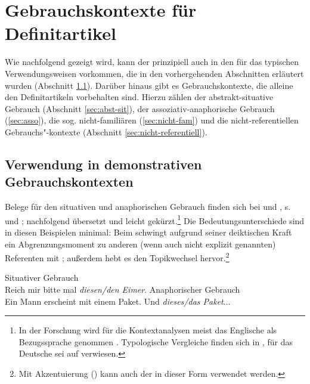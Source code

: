 \section{Gebrauchskontexte für Definitartikel}\label{sec:definitartikel}

Wie nachfolgend gezeigt wird, kann der  prinzipiell auch in den für das  typischen Verwendungsweisen vorkommen, die in den vorhergehenden Abschnitten erläutert wurden (Abschnitt \ref{sec:definitartikel-in-demonstrativ}). Darüber hinaus gibt es Gebrauchskontexte, die alleine den Definitartikeln vorbehalten sind. Hierzu zählen der abstrakt-situative Gebrauch  (Abschnitt \ref{sec:abst-sit}), der assoziativ-anaphorische  Gebrauch (\ref{sec:asso}), die sog. nicht-familiären (\ref{sec:nicht-fam}) und die nicht-referentiellen  Gebrauchs"-kontexte (Abschnitt \ref{sec:nicht-referentiell}). 

\subsection{Verwendung in demonstrativen Gebrauchskontexten}\label{sec:definitartikel-in-demonstrativ}

Belege für den situativen  und anaphorischen  Gebrauch finden sich bei \textcite[110--111]{Hawkins1978} und \textcite[36]{Himmelmann1997}, s.  und ; nachfolgend übersetzt und leicht gekürzt.\footnote{In der Forschung wird für die Kontextanalysen meist das Englische als Bezugssprache genommen \parencite{Christophersen1939, Lobner1985,Lyons1999}. Typologische Vergleiche finden sich in \textcite{Himmelmann1997}, für das Deutsche sei auf \textcite{Bisle-Muller1991} verwiesen.} Die Bedeutungsunterschiede sind in diesen Beispielen minimal: Beim  schwingt aufgrund seiner deiktischen Kraft ein Abgrenzungsmoment zu anderen (wenn auch nicht explizit genannten) Referenten mit \parencite{Bisle-Muller1991}; außerdem hebt es den Topikwechsel  hervor.\footnote{Mit Akzentuierung () kann auch der  in dieser Form verwendet werden.}   

\begin{exe}
	\ex \label{ex:sitdef} Situativer  Gebrauch\\ Reich mir bitte mal \textit{diesen/den Eimer}.
	\ex \label{ex:anadef} Anaphorischer Gebrauch\\ Ein Mann erscheint mit einem Paket. Und \textit{dieses/das Paket}...
\end{exe}

